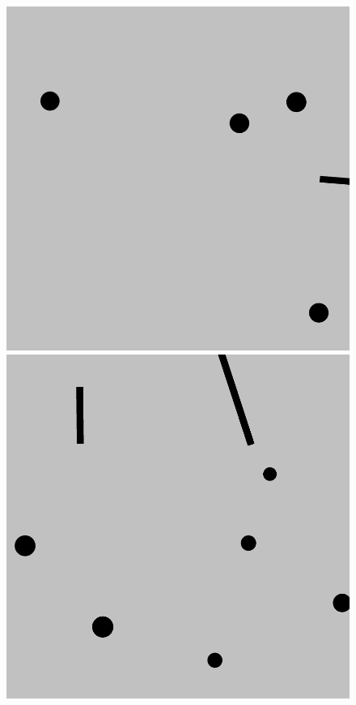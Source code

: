 \documentclass{beamer}
\begin{document}
\begin{frame}
\begin{figure}[H]
\begin{columns}
						\begin{column}{0.14\textwidth}
							\includegraphics[width=1\linewidth]{graphics/test_model_05_4.png}
							\includegraphics[width=1\linewidth]{graphics/test_model_08_4.png}

\end{column}
\end{columns}
\end{figure}
\end{frame}
\end{document}
